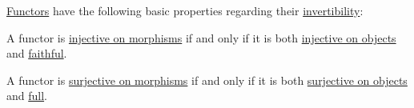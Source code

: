 \begin{proposition}\label{thm:def:functor_invertibility/properties}
  \hyperref[def:functor]{Functors} have the following basic properties regarding their \hyperref[def:functor_invertibility]{invertibility}:

  \begin{thmenum}
     A functor is \hyperref[def:functor_invertibility/injective_on_morphisms]{injective on morphisms} if and only if it is both \hyperref[def:functor_invertibility/injective_on_objects]{injective on objects} and \hyperref[def:functor_invertibility/faithful]{faithful}.

     A functor is \hyperref[def:functor_invertibility/surjective_on_morphisms]{surjective on morphisms} if and only if it is both \hyperref[def:functor_invertibility/surjective_on_objects]{surjective on objects} and \hyperref[def:functor_invertibility/full]{full}.
  \end{thmenum}
\end{proposition}
